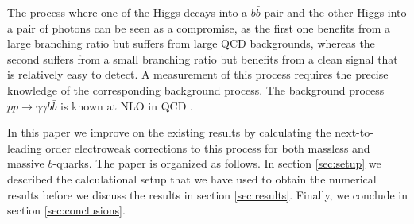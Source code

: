 The process where one of the Higgs decays into a $b\bar{b}$ pair and the other Higgs into a pair of photons can be seen 
as a compromise, as the first one benefits from a large branching ratio but suffers from large QCD backgrounds, whereas the 
second suffers from a small branching ratio but benefits from a clean signal that is relatively easy to detect. A measurement
of this process requires the precise knowledge of the corresponding background process. The background process 
$pp\to \gamma \gamma b \bar{b}$ is known at NLO in QCD \cite{Faeh:2017fpp}. 

In this paper we improve on the existing 
results by calculating the next-to-leading
order electroweak corrections to this process for both massless and massive $b$-quarks. The paper is organized as follows.
In section \ref{sec:setup} we described the calculational setup that we have used to obtain the numerical results before we
discuss the results in section \ref{sec:results}. Finally, we conclude in section \ref{sec:conclusions}.